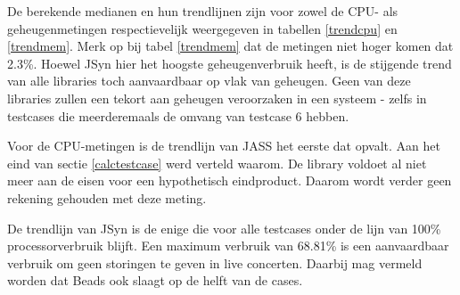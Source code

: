 De berekende medianen en hun trendlijnen zijn voor zowel de CPU- als geheugenmetingen respectievelijk weergegeven in tabellen \ref{trendcpu} en \ref{trendmem}. Merk op bij tabel \ref{trendmem} dat de metingen niet hoger komen dat 2.3\%. Hoewel JSyn hier het hoogste geheugenverbruik heeft, is de stijgende trend van alle libraries toch aanvaardbaar op vlak van geheugen. Geen van deze libraries zullen een tekort aan geheugen veroorzaken in een systeem - zelfs in testcases die meerderemaals de omvang van testcase 6 hebben.

Voor de CPU-metingen is de trendlijn van JASS het eerste dat opvalt. Aan het eind van sectie \ref{calctestcase} werd verteld waarom. De library voldoet al niet meer aan de eisen voor een hypothetisch eindproduct. Daarom wordt verder geen rekening gehouden met deze meting.

De trendlijn van JSyn is de enige die voor alle testcases onder de lijn van 100\% processorverbruik blijft. Een maximum verbruik van 68.81\% is een aanvaardbaar verbruik om geen storingen te geven in live concerten. Daarbij mag vermeld worden dat Beads ook slaagt op de helft van de cases.

